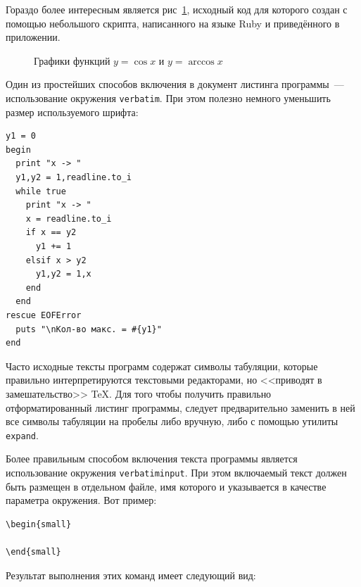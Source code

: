 Гораздо более интересным является рис~\ref{fig:cos_acos}, 
исходный код для которого создан с помощью небольшого скрипта,
написанного на языке Ruby и приведённого в приложении.

\begin{figure}[ht!]
\begin{center}

\end{center}
\caption{Графики функций $y=\cos x$ и $y=\arccos x$}\label{fig:cos_acos}
\end{figure}

Один из простейших способов включения в документ листинга программы~--- 
использование окружения \verb|verbatim|. При этом полезно немного
уменьшить размер используемого шрифта:

\begin{small}
\begin{verbatim}
y1 = 0
begin
  print "x -> "
  y1,y2 = 1,readline.to_i
  while true
    print "x -> "
    x = readline.to_i
    if x == y2
      y1 += 1
    elsif x > y2
      y1,y2 = 1,x
    end
  end
rescue EOFError
  puts "\nКол-во макс. = #{y1}"
end
\end{verbatim}
\end{small}

Часто исходные тексты программ содержат символы табуляции, которые
правильно интерпретируются текстовыми редакторами, но <<приводят в
замешательство>> \TeX. Для того чтобы получить правильно отформатированный
листинг программы, следует предварительно заменить в ней все символы табуляции
на пробелы либо вручную, либо с помощью утилиты \verb|expand|.

Более правильным способом включения текста программы является использование
окружения \verb|verbatiminput|. При этом
включаемый текст должен быть размещен в отдельном файле, имя которого и
указывается в качестве параметра окружения. Вот пример:

\begin{small}
\begin{verbatim}
\begin{small}

\end{small}
\end{verbatim}
\end{small}

Результат выполнения этих команд имеет следующий вид:

\begin{small}

\end{small}
